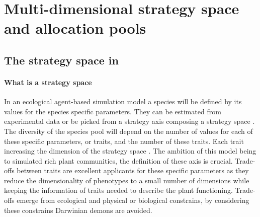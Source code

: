 \section{Multi-dimensional strategy space and allocation pools}
%

\subsection{The strategy space in \model}

\paragraph{What is a strategy space}
In an ecological agent-based simulation model a species will be defined by its values for the species specific parameters. They can be estimated from experimental data \cite{taubert_modelling_2014, maire_traits_2009,lohier_explaining_2014} or be picked from a strategy axis \cite{reineking_environmental_2006, kleidon_global_2000} composing a strategy space \cite{westoby_leaf-height-seed_1998}. The diversity of the species pool will depend on the number of values for each of these specific parameters, or traits, and the number of these traits. Each trait increasing the dimension of the strategy space \cite{laughlin_intrinsic_2014}. The ambition of this model being to simulated rich plant communities, the definition of these axis is crucial. Trade-offs between traits are excellent applicants for these specific parameters as they reduce the dimensionality of phenotypes to a small number of dimensions \cite{wright_worldwide_2004, diaz_global_2016, reich_world-wide_2014} while keeping the information of traits needed to describe the plant functioning. Trade-offs emerge from ecological and physical or biological constrains, by considering these constrains Darwinian demons are avoided.\\

